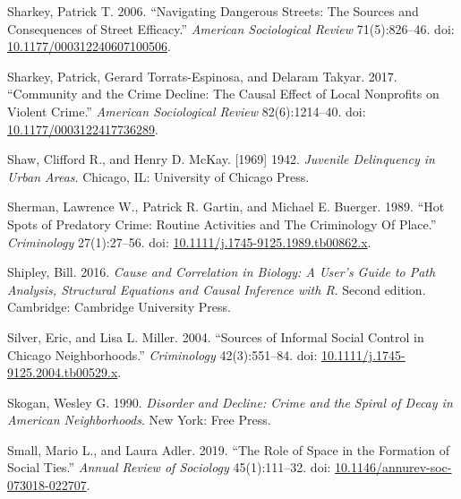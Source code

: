 \documentclass [11pt, proquest] {uwthesis}[2015/03/03]
\newlength{\cslhangindent}
\newenvironment{CSLReferences}[2]%
{\setlength{\parindent}{0pt}%
\everypar{\setlength{\hangindent}{\cslhangindent}}\ignorespaces}%
{\par}
\begin{document}
\begin{CSLReferences}{1}{0}
\leavevmode\hypertarget{ref-sharkeyNavigatingDangerousStreets2006}{}%
Sharkey, Patrick T. 2006. {``Navigating {Dangerous Streets}: {The Sources} and {Consequences} of {Street Efficacy}.''} \emph{American Sociological Review} 71(5):826--46. doi: \href{https://doi.org/10.1177/000312240607100506}{10.1177/000312240607100506}.

\leavevmode\hypertarget{ref-sharkeyCommunityCrimeDecline2017}{}%
Sharkey, Patrick, Gerard Torrats-Espinosa, and Delaram Takyar. 2017. {``Community and the {Crime Decline}: {The Causal Effect} of {Local Nonprofits} on {Violent Crime}.''} \emph{American Sociological Review} 82(6):1214--40. doi: \href{https://doi.org/10.1177/0003122417736289}{10.1177/0003122417736289}.

\leavevmode\hypertarget{ref-shawJuvenileDelinquencyUrban1942}{}%
Shaw, Clifford R., and Henry D. McKay. {[}1969{]} 1942. \emph{Juvenile {Delinquency} in {Urban Areas}}. {Chicago, IL}: {University of Chicago Press}.

\leavevmode\hypertarget{ref-shermanHotSpotsPredatory1989}{}%
Sherman, Lawrence W., Patrick R. Gartin, and Michael E. Buerger. 1989. {``Hot {Spots} of {Predatory Crime}: {Routine Activities} and {The Criminology Of Place}.''} \emph{Criminology} 27(1):27--56. doi: \href{https://doi.org/10.1111/j.1745-9125.1989.tb00862.x}{10.1111/j.1745-9125.1989.tb00862.x}.

\leavevmode\hypertarget{ref-shipleyCauseCorrelationBiology2016}{}%
Shipley, Bill. 2016. \emph{Cause and Correlation in Biology: A User's Guide to Path Analysis, Structural Equations and Causal Inference with {R}}. Second edition. {Cambridge}: {Cambridge University Press}.

\leavevmode\hypertarget{ref-silverSourcesInformalSocial2004}{}%
Silver, Eric, and Lisa L. Miller. 2004. {``Sources of {Informal Social Control} in {Chicago Neighborhoods}.''} \emph{Criminology} 42(3):551--84. doi: \href{https://doi.org/10.1111/j.1745-9125.2004.tb00529.x}{10.1111/j.1745-9125.2004.tb00529.x}.

\leavevmode\hypertarget{ref-skoganDisorderDeclineCrime1990}{}%
Skogan, Wesley G. 1990. \emph{Disorder and {Decline}: {Crime} and the {Spiral} of {Decay} in {American Neighborhoods}}. {New York}: {Free Press}.

\leavevmode\hypertarget{ref-smallRoleSpaceFormation2019}{}%
Small, Mario L., and Laura Adler. 2019. {``The {Role} of {Space} in the {Formation} of {Social Ties}.''} \emph{Annual Review of Sociology} 45(1):111--32. doi: \href{https://doi.org/10.1146/annurev-soc-073018-022707}{10.1146/annurev-soc-073018-022707}.


\end{CSLReferences}
\end{document}

